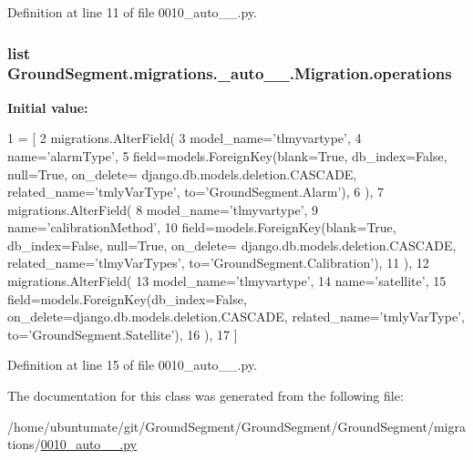 Definition at line 11 of file 0010\+\_\+auto\+\_\+\_.\+py.

\hypertarget{class_ground_segment_1_1migrations_1_10010__auto__20161127__2017_1_1_migration_a5c57bed13e9e570d7743139e338fdbb4}{}
\subsubsection[{operations}]{\setlength{\rightskip}{0pt plus 5cm}list Ground\+Segment.\+migrations.\+\_\+auto\+\_\+\_.\+Migration.\+operations\hspace{0.3cm}{\ttfamily [static]}}\label{class_ground_segment_1_1migrations_1_10010__auto__20161127__2017_1_1_migration_a5c57bed13e9e570d7743139e338fdbb4}
{\bfseries Initial value\+:}
\begin{DoxyCode}
1 = [
2         migrations.AlterField(
3             model\_name=\textcolor{stringliteral}{'tlmyvartype'},
4             name=\textcolor{stringliteral}{'alarmType'},
5             field=models.ForeignKey(blank=\textcolor{keyword}{True}, db\_index=\textcolor{keyword}{False}, null=\textcolor{keyword}{True}, on\_delete=
      django.db.models.deletion.CASCADE, related\_name=\textcolor{stringliteral}{'tmlyVarType'}, to=\textcolor{stringliteral}{'GroundSegment.Alarm'}),
6         ),
7         migrations.AlterField(
8             model\_name=\textcolor{stringliteral}{'tlmyvartype'},
9             name=\textcolor{stringliteral}{'calibrationMethod'},
10             field=models.ForeignKey(blank=\textcolor{keyword}{True}, db\_index=\textcolor{keyword}{False}, null=\textcolor{keyword}{True}, on\_delete=
      django.db.models.deletion.CASCADE, related\_name=\textcolor{stringliteral}{'tlmyVarTypes'}, to=\textcolor{stringliteral}{'GroundSegment.Calibration'}),
11         ),
12         migrations.AlterField(
13             model\_name=\textcolor{stringliteral}{'tlmyvartype'},
14             name=\textcolor{stringliteral}{'satellite'},
15             field=models.ForeignKey(db\_index=\textcolor{keyword}{False}, on\_delete=django.db.models.deletion.CASCADE, 
      related\_name=\textcolor{stringliteral}{'tmlyVarType'}, to=\textcolor{stringliteral}{'GroundSegment.Satellite'}),
16         ),
17     ]
\end{DoxyCode}


Definition at line 15 of file 0010\+\_\+auto\+\_\+\_.\+py.



The documentation for this class was generated from the following file\+:\begin{DoxyCompactItemize}
\item 
/home/ubuntumate/git/\+Ground\+Segment/\+Ground\+Segment/\+Ground\+Segment/migrations/\hyperlink{0010__auto__20161127__2017_8py}{0010\+\_\+auto\+\_\+\_.\+py}\end{DoxyCompactItemize}
